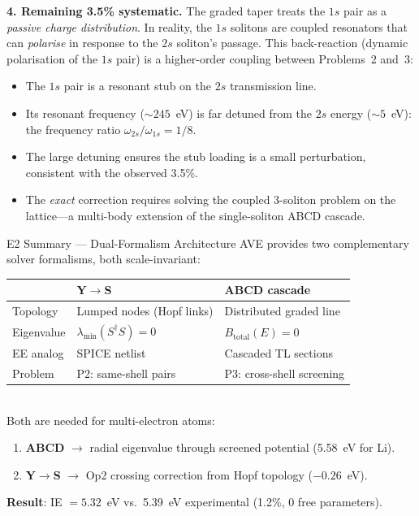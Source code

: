 \noindent\textbf{4. Remaining 3.5\% systematic.}
The graded taper treats the $1s$ pair as a \emph{passive
charge distribution}.  In reality, the $1s$ solitons are
coupled resonators that can \emph{polarise} in response
to the $2s$ soliton's passage.  This back-reaction
(dynamic polarisation of the $1s$ pair) is a
higher-order coupling between Problems~2 and~3:
\begin{itemize}
    \item The $1s$ pair is a resonant stub on the
          $2s$ transmission line.
    \item Its resonant frequency ($\sim 245$~eV)
          is far detuned from the $2s$ energy
          ($\sim 5$~eV): the frequency ratio
          $\omega_{2s}/\omega_{1s} = 1/8$.
    \item The large detuning ensures the stub
          loading is a small perturbation,
          consistent with the observed 3.5\%.
    \item The \emph{exact} correction requires
          solving the coupled 3-soliton problem
          on the lattice---a multi-body extension
          of the single-soliton ABCD cascade.
\end{itemize}

\begin{resultbox}{E2 Summary — Dual-Formalism Architecture}
AVE provides two complementary solver formalisms,
both scale-invariant:\\[4pt]
\renewcommand{\arraystretch}{1.2}
\begin{tabular}{lll}
& \textbf{Y$\to$S} & \textbf{ABCD cascade} \\
\hline
Topology & Lumped nodes (Hopf links)
         & Distributed graded line \\
Eigenvalue & $\lambda_{\min}(S^\dagger S) = 0$
           & $B_{\text{total}}(E) = 0$ \\
EE analog & SPICE netlist
          & Cascaded TL sections \\
Problem & P2: same-shell pairs
        & P3: cross-shell screening \\
\hline
\end{tabular}\\[4pt]
Both are needed for multi-electron atoms:
\begin{enumerate}
    \item \textbf{ABCD} $\to$ radial eigenvalue through
          screened potential (5.58~eV for Li).
    \item \textbf{Y$\to$S} $\to$ Op2 crossing correction
          from Hopf topology ($-0.26$~eV).
\end{enumerate}
\textbf{Result}: IE $= 5.32$~eV vs.\ 5.39~eV experimental
(1.2\%, 0 free parameters).
\end{resultbox}


